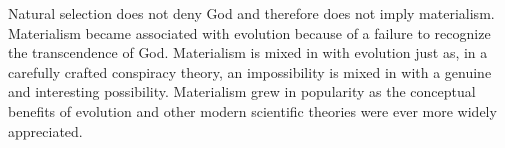 \documentclass[twocolumn]{article}
\begin{document}
Natural selection does not deny God and therefore does not imply materialism.
Materialism became associated with evolution because of a failure to recognize
the transcendence of God. Materialism is mixed in with evolution just as, in a
carefully crafted conspiracy theory, an impossibility is mixed in with a
genuine and interesting possibility.  Materialism grew in popularity as the
conceptual benefits of evolution and other modern scientific theories were ever
more widely appreciated.

%
%
%
%


\end{document}

